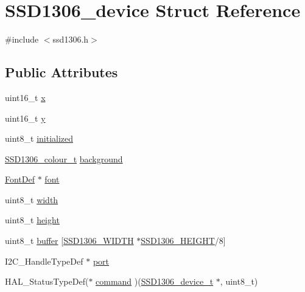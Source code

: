 \hypertarget{structSSD1306__device}{}\section{S\+S\+D1306\+\_\+device Struct Reference}
\label{structSSD1306__device}


{\ttfamily \#include $<$ssd1306.\+h$>$}

\subsection*{Public Attributes}
\begin{DoxyCompactItemize}
\item 
uint16\+\_\+t \hyperlink{structSSD1306__device_abbf07db1d4d5f7c247b2a3ef539adbcf}{x}
\item 
uint16\+\_\+t \hyperlink{structSSD1306__device_a696e3c8355fd319fc25fa4f711e496df}{y}
\item 
uint8\+\_\+t \hyperlink{structSSD1306__device_a92bef284d4e15d42355b42d04ebd0a82}{initialized}
\item 
\hyperlink{ssd1306_8h_a9fe094fa88309e2ded9db03d4c2771c6}{S\+S\+D1306\+\_\+colour\+\_\+t} \hyperlink{structSSD1306__device_ad0ea6059e91b7235d2de7c997f7d40e0}{background}
\item 
\hyperlink{structFontDef}{Font\+Def} $\ast$ \hyperlink{structSSD1306__device_a53ca4e27cd6fd4ccaf0a723fe1a9d26b}{font}
\item 
uint8\+\_\+t \hyperlink{structSSD1306__device_a122564b6310f5013331ef05c1cc2a9d1}{width}
\item 
uint8\+\_\+t \hyperlink{structSSD1306__device_a3c404b5a19887501f3624644bf710ecb}{height}
\item 
uint8\+\_\+t \hyperlink{structSSD1306__device_a304b1ccffa54fe02798eac9e4d113186}{buffer} \mbox{[}\hyperlink{ssd1306_8h_ae5a2aa8865dd03537b97fd1c9037371b}{S\+S\+D1306\+\_\+\+W\+I\+D\+TH} $\ast$\hyperlink{ssd1306_8h_a4e9409448a0df95c1686670e09b457b7}{S\+S\+D1306\+\_\+\+H\+E\+I\+G\+HT}/8\mbox{]}
\item 
I2\+C\+\_\+\+Handle\+Type\+Def $\ast$ \hyperlink{structSSD1306__device_a5434577f7055efeb61703b7b4a7896a7}{port}
\item 
H\+A\+L\+\_\+\+Status\+Type\+Def($\ast$ \hyperlink{structSSD1306__device_a00e78b709181f9a47c7be081e90eda4f}{command} )(\hyperlink{datatypes_8h_afa3700e77990b75b3fcc954070aa90fe}{S\+S\+D1306\+\_\+device\+\_\+t} $\ast$, uint8\+\_\+t)
\item 

\end{DoxyCompactItemize}
